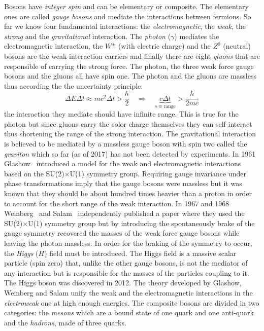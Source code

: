 Bosons have \emph{integer spin} and can be elementary or composite. The
elementary ones are called \emph{gauge bosons} and mediate the interactions
between fermions. So far we know four fundamental interactions: the
\emph{electromagnetic}, the \emph{weak}, the \emph{strong} and the
\emph{gravitational} interaction. The \emph{photon} ($\gamma$) mediates the
electromagnetic interaction, the $W^\pm$ (with electric charge) and the $Z^0$
(neutral) bosons are the weak interaction carriers and finally there are eight
\emph{gluons} that are responsible of carrying the strong force. The photon, the
three weak force gauge bosons and the gluons all have spin one. The photon and
the gluons are massless thus according the the uncertainty principle:
\begin{equation}
  \label{eq:149}
  \Delta E \Delta t \approx mc^2 \Delta t > \frac{\hbar}{2} \quad \Rightarrow \quad
  \underbrace{c \Delta t}_{s \equiv \mathrm{range}} > \frac{\hbar}{2mc}
\end{equation}
the interaction they mediate should have infinite range. This is true for the
photon but since gluons carry the color charge themselves they can self-interact
thus shortening the range of the strong interaction. The gravitational
interaction is believed to be mediated by a massless gauge boson with spin two
called the \emph{graviton} which so far (as of 2017) has not been detected by
experiments. In 1961 Glashow~\cite{GlashowPaper} introduced a model for the weak
and electromagnetic interactions based on the SU(2)$\times$U(1) symmetry
group. Requiring gauge invariance under phase transformations imply that the
gauge bosons were massless but it was known that they should be about hundred
times heavier than a proton in order to account for the short range of the weak
interaction. In 1967 and 1968 Weinberg~\cite{WeinbergPaper} and
Salam~\cite{SalamPaper} independently published a paper where they used the
SU(2)$\times$U(1) symmetry group but by introducing the spontaneously brake of
the gauge symmetry recovered the masses of the weak force gauge bosons while
leaving the photon massless. In order for the braking of the symmetry to occur,
the \emph{Higgs} ($H$) field must be introduced. The Higgs field is a massive
scalar particle (spin zero) that, unlike the other gauge bosons, is not the
mediator of any interaction but is responsible for the masses of the particles
coupling to it. The Higgs boson was discovered in 2012. The theory developed by
Glashow, Weinberg and Salam unify the weak and the electromagnetic interactions
in the \emph{electroweak} one at high enough energies. The composite bosons are
divided in two categories: the \emph{mesons} which are a bound state of one
quark and one anti-quark and the \emph{hadrons}, made of three quarks.

